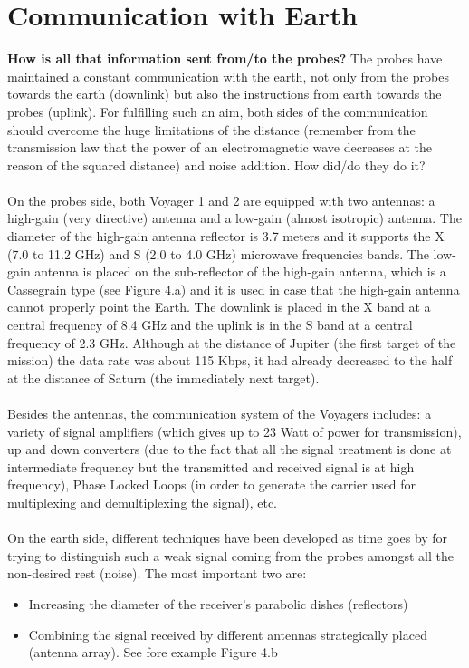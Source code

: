 \documentclass[11pt,a4paper]{article}
\begin{document}
\section{Communication with Earth}
\textbf{How is all that information sent from/to the probes?}
The probes have maintained a constant communication with the earth, not only from the probes towards the earth (downlink) but also the instructions from earth towards the probes (uplink). For fulfilling such an aim, both sides of the communication should overcome the huge limitations of the distance (remember from the transmission law that the power of an electromagnetic wave decreases at the reason of the squared distance) and noise addition. How did/do they do it?
\\\\
On the probes side, both Voyager 1 and 2 are equipped with two antennas: a high-gain (very directive) antenna and a low-gain (almost isotropic) antenna. The diameter of the high-gain antenna reflector is 3.7 meters and it supports the X (7.0 to 11.2 GHz) and S (2.0 to 4.0 GHz) microwave frequencies bands. The low-gain antenna is placed on the sub-reflector of the high-gain antenna, which is a Cassegrain type (see Figure 4.a) and it is used in case that the high-gain antenna cannot properly point the Earth. The downlink is placed in the X band at a central frequency of 8.4 GHz and the uplink is in the S band at a central frequency of 2.3 GHz. Although at the distance of Jupiter (the first target of the mission) the data rate was about 115 Kbps, it had already decreased to the half at the distance of Saturn (the immediately next target).
\\\\
Besides the antennas, the communication system of the Voyagers includes: a variety of signal amplifiers (which gives up to 23 Watt of power for transmission), up and down converters (due to the fact that all the signal treatment is done at intermediate frequency but the transmitted and received signal is at high frequency), Phase Locked Loops (in order to generate the carrier used for multiplexing and demultiplexing the signal), etc.
\\\\
On the earth side, different techniques have been developed as time goes by for trying to distinguish such a weak signal coming from the probes amongst all the non-desired rest (noise). The most important two are:  
\begin{itemize}
\item Increasing the diameter of the receiver's parabolic dishes (reflectors)
\item Combining the signal received by different antennas strategically placed (antenna array). See fore example Figure 4.b
\end{itemize}
\end{document}
